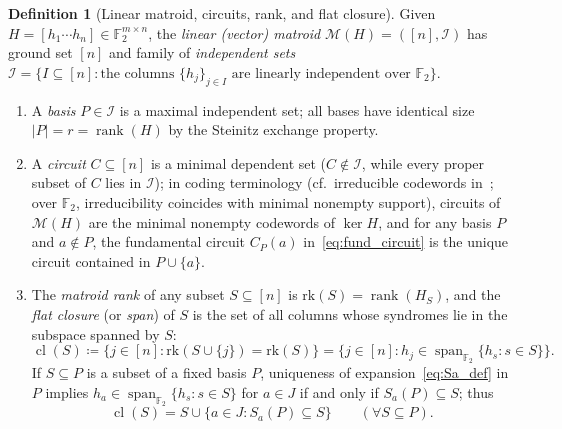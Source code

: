 \documentclass[12pt]{article}
\theoremstyle{definition}
\newtheorem{definition}{Definition}
\newcommand{\Ftwo}{\mathbb{F}_2}
\DeclareMathOperator{\rank}{rank}
\DeclareMathOperator{\cl}{cl}
\begin{document}
\begin{definition}[Linear matroid, circuits, rank, and flat closure]\label{def:matroid}
Given $H = [h_1 \cdots h_n] \in \Ftwo^{m \times n}$, the \emph{linear (vector) matroid} $\mathcal{M}(H) = ([n],
\mathcal{I})$ has ground set $[n]$ and family of \emph{independent sets} $\mathcal{I} = \{I \subseteq [n] :
\text{the columns } \{h_j\}_{j \in I} \text{ are linearly independent over } \Ftwo\}$.
\begin{enumerate}[label=(\alph*)]
  \item A \emph{basis} $P \in \mathcal{I}$ is a maximal independent set; all bases have identical size $|P| = r =
    \rank(H)$ by the Steinitz exchange property.
  \item A \emph{circuit} $C \subseteq [n]$ is a minimal dependent set ($C \notin \mathcal{I}$, while every proper
    subset of $C$ lies in $\mathcal{I}$); in coding terminology (cf.\ irreducible codewords in~\cite{DKP17}; over
    $\Ftwo$, irreducibility coincides with minimal nonempty support), circuits of $\mathcal{M}(H)$ are the minimal
    nonempty codewords of $\ker H$, and for any basis $P$ and $a \notin P$, the fundamental circuit $C_P(a)$
    in~\eqref{eq:fund_circuit} is the unique circuit contained in $P \cup \{a\}$.
  \item The \emph{matroid rank} of any subset $S \subseteq [n]$ is $\mathrm{rk}(S) = \rank(H_S)$, and the \emph{flat
    closure} (or \emph{span}) of $S$ is the set of all columns whose syndromes lie in the subspace spanned by $S$:
    \begin{equation}\label{eq:closure_def}
      \cl(S) \coloneqq \{j \in [n] : \mathrm{rk}(S \cup \{j\}) = \mathrm{rk}(S)\}
                     = \bigl\{j \in [n] : h_j \in \operatorname{span}_{\Ftwo}\{h_s : s \in S\}\bigr\}.
    \end{equation}
    If $S \subseteq P$ is a subset of a fixed basis $P$, uniqueness of expansion~\eqref{eq:Sa_def} in $P$ implies
    $h_a \in \operatorname{span}_{\Ftwo}\{h_s : s \in S\}$ for $a \in J$ if and only if $S_a(P) \subseteq S$; thus
    \begin{equation}\label{eq:closure_basis}
      \cl(S) = S \cup \{a \in J : S_a(P) \subseteq S\} \qquad (\forall S \subseteq P).
    \end{equation}
\end{enumerate}
\end{definition}
\end{document}
